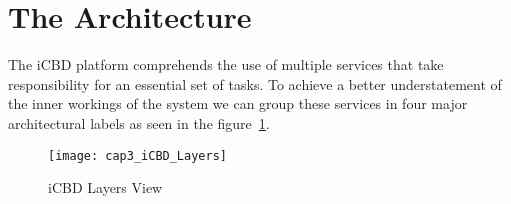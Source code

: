 \section{The Architecture} %
\label{sec:icbd_architecture}


The iCBD platform comprehends the use of multiple services that take responsibility for an essential set of tasks. To achieve a better understatement of the inner workings of the system we can group these services in four major architectural labels as seen in the figure~\ref{fig:icbd_layers}.


\begin{figure}[htbp]
	\centering
	\texttt{[image: cap3\_iCBD\_Layers]}
	\caption{iCBD Layers View}
	\label{fig:icbd_layers}
\end{figure}


